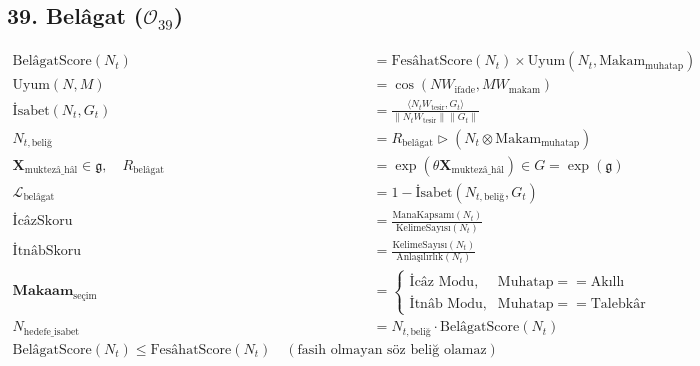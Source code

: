 \documentclass[11pt, a4paper]{article}
\begin{document}
\subsection{39. Belâgat ($\mathcal{O}_{39}$)}
\begin{align}
\text{BelâgatScore}(N_t) &= \text{FesâhatScore}(N_t) \times \text{Uyum}\left( N_t, \text{Makam}_{\text{muhatap}} \right) \\
\text{Uyum}(N, M) &= \cos(N W_{\text{ifade}}, M W_{\text{makam}}) \\
\text{İsabet}(N_t, G_t) &= \frac{\langle N_t W_{\text{tesir}}, G_t \rangle}{\|N_t W_{\text{tesir}}\| \|G_t\|} \\
N_{t, \text{beliğ}} &= R_{\text{belâgat}} \triangleright (N_t \otimes \text{Makam}_{\text{muhatap}}) \\
\mathbf{X}_{\text{muktezâ\_hâl}} \in \mathfrak{g}, \quad R_{\text{belâgat}} &= \exp(\theta \mathbf{X}_{\text{muktezâ\_hâl}}) \in G = \exp(\mathfrak{g}) \\
\mathcal{L}_{\text{belâgat}} &= 1 - \text{İsabet}(N_{t, \text{beliğ}}, G_t) \\
\text{İcâzSkoru} &= \frac{\text{ManaKapsamı}(N_t)}{\text{KelimeSayısı}(N_t)} \\
\text{İtnâbSkoru} &= \frac{\text{KelimeSayısı}(N_t)}{\text{Anlaşılırlık}(N_t)} \\
\mathbf{Makaam}_{\text{seçim}} &= 
\begin{cases}
\text{İcâz Modu}, & \text{Muhatap} == \text{Akıllı} \\
\text{İtnâb Modu}, & \text{Muhatap} == \text{Talebkâr}
\end{cases} \\
N_{\text{hedefe\_isabet}} &= N_{t, \text{beliğ}} \cdot \text{BelâgatScore}(N_t) \\
\text{BelâgatScore}(N_t) \le \text{FesâhatScore}(N_t) \quad (\text{fasih olmayan söz beliğ olamaz})
\end{align}
\end{document}
